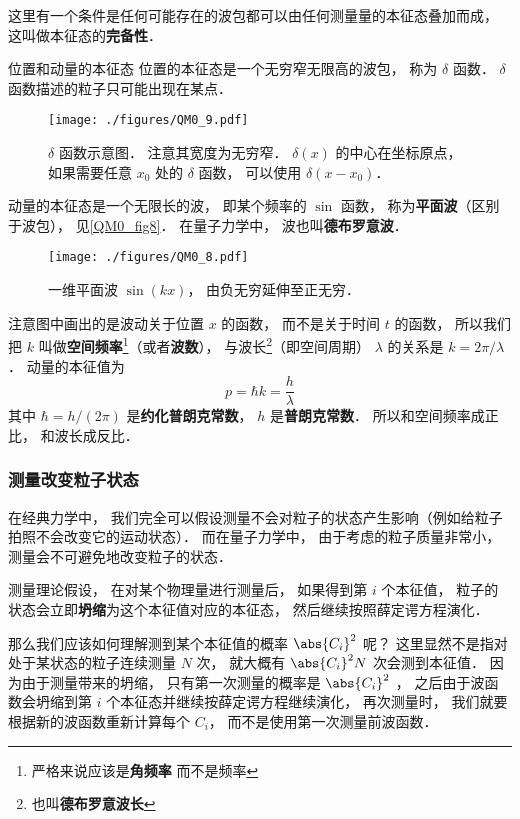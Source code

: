 这里有一个条件是任何可能存在的波包都可以由任何测量量的本征态叠加而成， 这叫做本征态的\textbf{完备性}．

\begin{example}{位置和动量的本征态}
位置的本征态是一个无穷窄无限高的波包， 称为 $\delta$ 函数． $\delta$ 函数描述的粒子只可能出现在某点． 
\begin{figure}[ht]
\centering
\texttt{[image: ./figures/QM0\_9.pdf]}
\caption{$\delta$ 函数示意图． 注意其宽度为无穷窄． $\delta(x)$ 的中心在坐标原点， 如果需要任意 $x_0$ 处的 $\delta$ 函数， 可以使用 $\delta(x - x_0)$．} \label{QM0_fig9} %
\end{figure}

动量的本征态是一个无限长的波， 即某个频率的 $\sin$ 函数， 称为\textbf{平面波}（区别于波包）， 见\autoref{QM0_fig8}． 在量子力学中， 波也叫\textbf{德布罗意波}．

\begin{figure}[ht]
\centering
\texttt{[image: ./figures/QM0\_8.pdf]}
\caption{一维平面波 $\sin(kx)$， 由负无穷延伸至正无穷．} \label{QM0_fig8}
\end{figure}

注意图中画出的是波动关于位置 $x$ 的函数， 而不是关于时间 $t$ 的函数， 所以我们把 $k$ 叫做\textbf{空间频率}\footnote{严格来说应该是\textbf{角频率} 而不是频率}（或者\textbf{波数}）， %
与波长\footnote{也叫\textbf{德布罗意波长}}（即空间周期） $\lambda$ 的关系是 $k = 2\pi/\lambda$． 动量的本征值为
\begin{equation}
p = \hbar k = \frac{h}{\lambda}
\end{equation}
其中 $\hbar = h / (2\pi)$ 是\textbf{约化普朗克常数}， $h$ 是\textbf{普朗克常数}． 所以和空间频率成正比， 和波长成反比．
\end{example}

\subsubsection{测量改变粒子状态}
在经典力学中， 我们完全可以假设测量不会对粒子的状态产生影响（例如给粒子拍照不会改变它的运动状态）． 而在量子力学中， 由于考虑的粒子质量非常小， 测量会不可避免地改变粒子的状态．

测量理论假设， 在对某个物理量进行测量后， 如果得到第 $i$ 个本征值， 粒子的状态会立即\textbf{坍缩}为这个本征值对应的本征态， 然后继续按照薛定谔方程演化．

那么我们应该如何理解测到某个本征值的概率 $\abs{C_i}^2$ 呢？ 这里显然不是指对处于某状态的粒子连续测量 $N$ 次， 就大概有 $\abs{C_i}^2 N$ 次会测到本征值． 因为由于测量带来的坍缩， 只有第一次测量的概率是 $\abs{C_i}^2$ ， 之后由于波函数会坍缩到第 $i$ 个本征态并继续按薛定谔方程继续演化， 再次测量时， 我们就要根据新的波函数重新计算每个 $C_i$， 而不是使用第一次测量前波函数．

